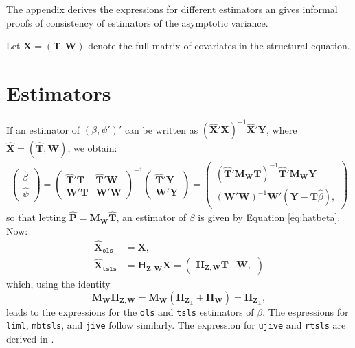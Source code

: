 \documentclass{mynotes}
\newcommand{\by}{\mathbf{Y}} %
\newcommand{\bx}{\mathbf{X}} %
\newcommand{\bt}{\mathbf{T}} %
\newcommand{\bz}{\mathbf{Z}} %
\newcommand{\bp}{\mathbf{P}} %
\newcommand{\bw}{\mathbf{W}} %
\newcommand{\Hm}[1]{\mathbf{H}_{#1}} %
\newcommand{\Mm}[1]{\mathbf{M}_{#1}} %
\begin{document}
\begin{appendices}
  The appendix derives the expressions for different estimators an gives
  informal proofs of consistency of estimators of the asymptotic variance.

  Let $\bx=(\bt,\bw)$ denote the full matrix of covariates in the structural
  equation.

\section{Estimators}
If an estimator of $(\beta,\psi')'$ can be written as
$(\hat{\bx}'\bx)^{-1}\hat{\bx}'\by$, where $\hat{\bx}=(\hat{\bt},\bw)$, we
obtain:
  \begin{align}\label{eq:betapsi}
    \begin{pmatrix}
      \hat{\beta}\\\hat{\psi}
    \end{pmatrix}=
    \begin{pmatrix}
      \hat{\bt}'\bt& \hat{\bt}'\bw\\
      \bw'\bt&\bw'\bw
    \end{pmatrix}^{-1}
    \begin{pmatrix}
      \hat{\bt}'\by\\
      \bw'\by
    \end{pmatrix}
    =
    \begin{pmatrix}
      (\hat{\bt}'\Mm{\bw}\bt)^{-1}\hat{\bt}'\Mm{\bw}\by\\
      (\bw'\bw)^{-1}\bw'(\by-\bt\hat{\beta}),
    \end{pmatrix}
  \end{align}
  so that letting $\hat{\bp}=\Mm{\bw}\hat{\bt}$, an estimator of $\beta$ is
  given by Equation \eqref{eq:hatbeta}. Now:
  \begin{align*}
    \hat{\bx}_{\mathtt{ols}}&=\bx,\\
    \hat{\bx}_{\mathtt{tsls}}&=\Hm{\bz,\bw}\bx=
    \begin{pmatrix}
      \Hm{\bz,\bw}\bt& \bw,
    \end{pmatrix}
  \end{align*}
  which, using the identity
  \begin{equation}\label{eq:Hzw}
    \Mm{\bw}\Hm{\bz,\bw}=\Mm{\bw}(\Hm{\bz_{\perp}}+\Hm{\bw})=\Hm{\bz_{\perp}},
  \end{equation}
  leads to the expressions for the \texttt{ols} and \texttt{tsls} estimators of
  $\beta$. The espressions for \texttt{liml}, \texttt{mbtsls}, and \texttt{jive}
  follow similarly. The expression for \texttt{ujive} and \texttt{rtsls} are
  derived in \citet{kolesar12late}.


\end{appendices}
\end{document}
